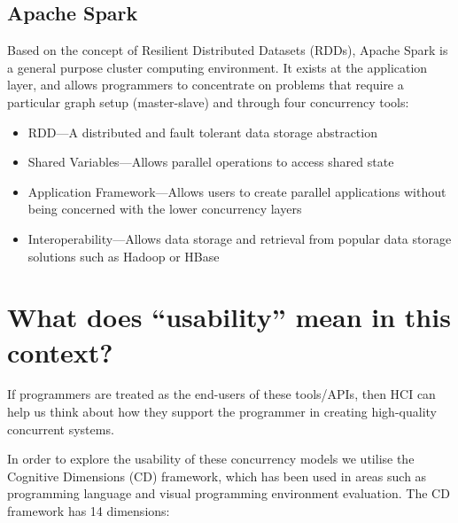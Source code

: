 \documentclass{sig-alternate}
\begin{document}
\subsection{Apache Spark}
Based on the concept of Resilient Distributed Datasets
(RDDs)\cite{zaharia14:_archit_fast_gener_data_proces_large_clust},
Apache Spark is a general purpose cluster computing environment. It
exists at the application layer, and allows programmers to concentrate
on problems that require a particular graph setup (master-slave) and
through four concurrency tools:

\begin{itemize}
\item RDD---A distributed and fault tolerant data storage abstraction
\item Shared Variables---Allows parallel operations to access shared state
\item Application Framework---Allows users to create parallel applications without being concerned with the lower concurrency layers
\item Interoperability---Allows data storage and retrieval from popular data storage solutions such as Hadoop or HBase
\end{itemize}

\section{What does ``usability'' mean in this context?}
If programmers are treated as the end-users of these tools/APIs, then
HCI can help us think about how they support the programmer in
creating high-quality\cite{9126} concurrent systems.

In order to explore the usability of these concurrency models we
utilise the Cognitive Dimensions\cite{green89:_cognit_dimen_notat}
(CD) framework, which has been used in areas such as programming
language\cite{enpl} and visual programming environment
evaluation\cite{cdf}. The CD framework has 14 dimensions:
\end{document}
